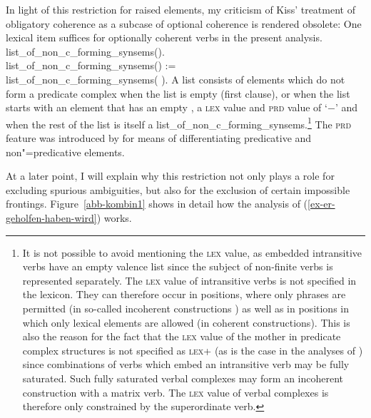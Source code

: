 {{{In light of this restriction for raised elements, my criticism \citep[--352]{Mueller99a} of Kiss' treatment of
		obligatory coherence as a subcase of optional coherence \citep[]{Kiss95a} is rendered obsolete: One lexical
		item suffices for optionally coherent verbs in the present analysis.
}
\ea
\label{constr-non-complex-forming}
list\_of\_non\_c\_forming\_synsems(\eliste).\\
list\_of\_non\_c\_forming\_synsems() :=\\
\flushright        list\_of\_non\_c\_forming\_synsems(  ).
\z
A list consists of elements which do not form a predicate complex when the list is empty (first
clause), or when the list starts with an element that has an empty \compsl, a \textsc{lex} value and
\textsc{prd} value of `$-$' and when the rest of the list  is itself a list\_of\_non\_c\_forming\_synsems.\footnote{%
		It is not possible to avoid mentioning the \textsc{lex} value, as embedded intransitive verbs have
		an empty valence list since the subject of non-finite verbs is represented separately. The \textsc{lex} value of
		intransitive verbs is not specified in the lexicon. They can therefore occur in positions, 
		where only phrases are permitted (in so-called incoherent constructions \citep{Bech55a}) as
		well as in positions in which only lexical elements are allowed (in coherent constructions). 
		This is also the reason for the fact that the \textsc{lex} value of the mother in predicate complex
		structures is not specified as \textsc{lex}+ (as is the case in the analyses of \citealp{HN94a,dKM2001a}) since combinations
		of verbs which embed an intransitive verb may be fully saturated. Such fully
                saturated verbal complexes may form an incoherent construction with a matrix
                verb. The \textsc{lex} value of verbal complexes is therefore only constrained by the superordinate verb.%
}
The \textsc{prd} feature was introduced by \citet[--67]{ps} for means of differentiating predicative and non"=predicative
elements.

At a later point, I will explain why this restriction not only plays a role for excluding spurious
ambiguities, but also for the exclusion of certain impossible frontings.
Figure~\vref{abb-kombin1} shows in detail how the analysis of (\ref{ex-er-geholfen-haben-wird}) works.

}}
